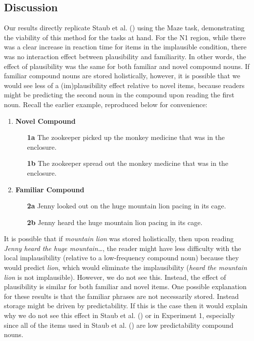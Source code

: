 \documentclass[
  12pt,
  letterpaper,
]{scrreprt}
\begin{document}
\subsection{Discussion}\label{discussion}

Our results directly replicate Staub et al.
() using the Maze
task, demonstrating the viability of this method for the tasks at hand.
For the N1 region, while there was a clear increase in reaction time for
items in the implausible condition, there was no interaction effect
between plausibility and familiarity. In other words, the effect of
plausibility was the same for both familiar and novel compound nouns. If
familiar compound nouns are stored holistically, however, it is possible
that we would see less of a (im)plausibility effect relative to novel
items, because readers might be predicting the second noun in the
compound upon reading the first noun. Recall the earlier example,
reproduced below for convenience:

\begin{enumerate}
   \item \textbf{Novel Compound}
    \begin{enumerate}
        \item[\textbf{1a}] The zookeeper picked up the monkey medicine that was in the enclosure.
        \item[\textbf{1b}] The zookeeper spread out the monkey medicine that was in the enclosure.
    \end{enumerate} \label{staubsentencenovel}
    \item \textbf{Familiar Compound}
    \begin{enumerate}
        \item[\textbf{2a}] Jenny looked out on the huge mountain lion pacing in its cage. \label{familiarplaus}
        \item[\textbf{2b}] Jenny heard the huge mountain lion pacing in its cage. \label{familiarimplaus}
    \end{enumerate} \label{figanext}
\end{enumerate}

\noindent It is possible that if \emph{mountain lion} was stored
holistically, then upon reading \emph{Jenny heard the huge
mountain\ldots{}}, the reader might have less difficulty with the local
implausibility (relative to a low-frequency compound noun) because they
would predict \emph{lion}, which would eliminate the implausibility
(\emph{heard the mountain lion} is not implausible). However, we do not
see this. Instead, the effect of plausibility is similar for both
familiar and novel items. One possible explanation for these results is
that the familiar phrases are not necessarily stored. Instead storage
might be driven by predictability. If this is the case then it would
explain why we do not see this effect in Staub et al.
() or in Experiment
1, especially since all of the items used in Staub et al.
() are low
predictability compound nouns.
\end{document}
